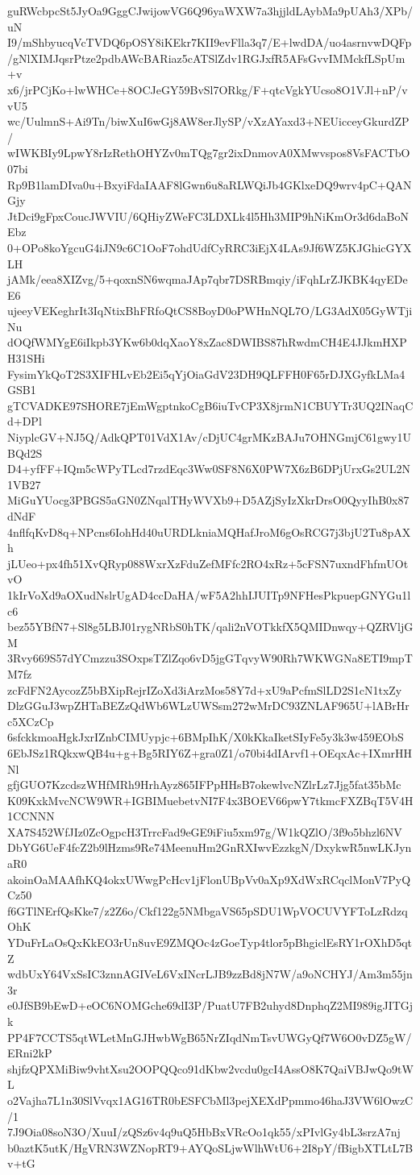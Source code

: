 guRWcbpcSt5JyOa9GggCJwijowVG6Q96yaWXW7a3hjjldLAybMa9pUAh3/XPb/uN
I9/mShbyucqVcTVDQ6pOSY8iKEkr7KII9evFlla3q7/E+lwdDA/uo4asrnvwDQFp
/gNlXIMJqsrPtze2pdbAWcBARiaz5cATSlZdv1RGJxfR5AFsGvvIMMckfLSpUm+v
x6/jrPCjKo+lwWHCe+8OCJeGY59BvSl7ORkg/F+qtcVgkYUcso8O1VJl+nP/vvU5
wc/UulmnS+Ai9Tn/biwXuI6wGj8AW8erJlySP/vXzAYaxd3+NEUicceyGkurdZP/
wIWKBIy9LpwY8rIzRethOHYZv0mTQg7gr2ixDnmovA0XMwvspos8VsFACTbO07bi
Rp9B1lamDIva0u+BxyiFdaIAAF8lGwn6u8aRLWQiJb4GKlxeDQ9wrv4pC+QANGjy
JtDci9gFpxCoucJWVIU/6QHiyZWeFC3LDXLk4l5Hh3MIP9hNiKmOr3d6daBoNEbz
0+OPo8koYgcuG4iJN9c6C1OoF7ohdUdfCyRRC3iEjX4LAs9Jf6WZ5KJGhicGYXLH
jAMk/eea8XIZvg/5+qoxnSN6wqmaJAp7qbr7DSRBmqiy/iFqhLrZJKBK4qyEDeE6
ujeeyVEKeghrIt3IqNtixBhFRfoQtCS8BoyD0oPWHnNQL7O/LG3AdX05GyWTjiNu
dOQfWMYgE6iIkpb3YKw6b0dqXaoY8xZac8DWIBS87hRwdmCH4E4JJkmHXPH31SHi
FysimYkQoT2S3XIFHLvEb2Ei5qYjOiaGdV23DH9QLFFH0F65rDJXGyfkLMa4GSB1
gTCVADKE97SHORE7jEmWgptnkoCgB6iuTvCP3X8jrmN1CBUYTr3UQ2INaqCd+DPl
NiyplcGV+NJ5Q/AdkQPT01VdX1Av/cDjUC4grMKzBAJu7OHNGmjC61gwy1UBQd2S
D4+yfFF+IQm5cWPyTLcd7rzdEqc3Ww0SF8N6X0PW7X6zB6DPjUrxGs2UL2N1VB27
MiGuYUocg3PBGS5aGN0ZNqalTHyWVXb9+D5AZjSyIzXkrDrsO0QyyIhB0x87dNdF
4nflfqKvD8q+NPcns6IohHd40uURDLkniaMQHafJroM6gOsRCG7j3bjU2Tu8pAXh
jLUeo+px4fh51XvQRyp088WxrXzFduZefMFfc2RO4xRz+5cFSN7uxndFhfmUOtvO
1kIrVoXd9aOXudNslrUgAD4ccDaHA/wF5A2hhIJUITp9NFHesPkpuepGNYGu1lc6
bez55YBfN7+Sl8g5LBJ01rygNRbS0hTK/qali2nVOTkkfX5QMIDnwqy+QZRVljGM
3Rvy669S57dYCmzzu3SOxpsTZlZqo6vD5jgGTqvyW90Rh7WKWGNa8ETI9mpTM7fz
zcFdFN2AycozZ5bBXipRejrIZoXd3iArzMos58Y7d+xU9aPcfmSlLD2S1cN1txZy
DlzGGuJ3wpZHTaBEZzQdWb6WLzUWSsm272wMrDC93ZNLAF965U+lABrHrc5XCzCp
6sfckkmoaHgkJxrIZnbCIMUypjc+6BMpIhK/X0kKkaIketSIyFe5y3k3w459EObS
6EbJSz1RQkxwQB4u+g+Bg5RIY6Z+gra0Z1/o70bi4dIArvf1+OEqxAc+IXmrHHNl
gfjGUO7KzcdszWHfMRh9HrhAyz865IFPpHHsB7okewlvcNZlrLz7Jjg5fat35bMc
K09KxkMvcNCW9WR+IGBIMuebetvNI7F4x3BOEV66pwY7tkmcFXZBqT5V4H1CCNNN
XA7S452WfJIz0ZcOgpcH3TrrcFad9eGE9iFiu5xm97g/W1kQZlO/3f9o5bhzl6NV
DbYG6UeF4fcZ2b9lHzms9Re74MeenuHm2GnRXIwvEzzkgN/DxykwR5nwLKJynaR0
akoinOaMAAfhKQ4okxUWwgPcHcv1jFlonUBpVv0aXp9XdWxRCqclMonV7PyQCz50
f6GTlNErfQsKke7/z2Z6o/Ckf122g5NMbgaVS65pSDU1WpVOCUVYFToLzRdzqOhK
YDuFrLaOsQxKkEO3rUn8uvE9ZMQOc4zGoeTyp4tlor5pBhgiclEsRY1rOXhD5qtZ
wdbUxY64VxSsIC3znnAGIVeL6VxINcrLJB9zzBd8jN7W/a9oNCHYJ/Am3m55jn3r
e0JfSB9bEwD+eOC6NOMGche69dI3P/PuatU7FB2uhyd8DnphqZ2MI989igJITGjk
PP4F7CCTS5qtWLetMnGJHwbWgB65NrZIqdNmTsvUWGyQf7W6O0vDZ5gW/ERni2kP
shjfzQPXMiBiw9vhtXsu2OOPQQco91dKbw2vcdu0gcI4AssO8K7QaiVBJwQo9tWL
o2Vajha7L1n30SlVvqx1AG16TR0bESFCbMl3pejXEXdPpmmo46haJ3VW6lOwzC/1
7J9Oia08soN3O/XuuI/zQSz6v4q9uQ5HbBxVRcOo1qk55/xPIvlGy4bL3srzA7nj
b0aztK5utK/HgVRN3WZNopRT9+AYQoSLjwWlhWtU6+2I8pY/fBigbXTLtL7Bv+tG
